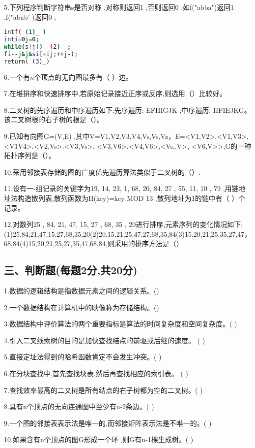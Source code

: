 5.下列程序判断字符串s是否对称 ,对称则返回1 ,否则返回0 ;如f("abba")返回1 ,f("abab' )返回0 ;
\begin{lstlisting}[language=bash]
intf( (1)_ )
inti=0j=0;
while(s[j])_ (2)_ ;
fi--j&j&si[=ij;++j-);
return( (3)_)
\end{lstlisting}

6.一个有$n$个顶点的无向图最多有（  ）边。

7.在堆排序和快速排序中,若原始记录接近正序或反序,则选用（）比较好。

8.二叉树的先序遍历和中序遍历如下:先序遍历: EFHIGJK ;中序遍历: HFIEJKG。 该二叉树根的右子树的根是（）。

9.已知有向图G=(V,E) ,其中V={V1,V2,V3,V4,Vs,Vs,Vz}，E={<V1,V2>,<V1,V3>,<V1V4>.<V2,Vs>.<V3,Vs>. <V3,V6>.<V4,V6>,<Vs,.V>, <V6,V>>},G的一种拓扑序列是（）。

10.采用邻接表存储的图的广度优先遍历算法类似于二叉树的（）.

11.设有一-组记录的关键字为{19, 14, 23, 1, 68, 20, 84, 27 , 55, 11, 10 , 79} ,用链地址法构造散列表,散列函数为H(key)=key MOD 13 ,散列地址为1的链中有（  ）个记录。

12.对数列{25 , 84, 21, 47, 15, 27 , 68, 35 , 20}进行排序,元素序列的变化情况如下:
(1)25,84,21,47,15,27,68,35,20(2)20,15,21,25,47,27,68,35,84(3)15,20,21,25,35,27,47，68,84(4)15,20,21,25,27,35,47,68,84,则采用的排序方法是（）

\subsection{三、判断题(每题2分,共20分)}
1.数据的逻辑结构是指数据元素之间的逻辑关系。()

2.一个数据结构在计算机中的映像称为存储结构。()

3.数据结构中评价算法的两个重要指标是算法的时间复杂度和空间复杂度。( )

4.引入二叉线索树的目的是加快查找结点的前驱或后继的速度。 ( )

5.直接定址法得到的哈希函数肯定不会发生冲突。( )

6.在分块查找中,首先查找块表,然后再查找相应的索引表。 ( )

7.查找效率最高的二又树是所有结点的右子树都为空的二叉树。( )

8.具有n个顶点的无向连通图中至少有n-2条边。( )

9.一个图的邻接表表示法是唯一的,而邻接矩阵表示法是不唯一的。( )

10.如果含有n个顶点的图G形成一个环 ,则G有n-1棵生成树。( )
